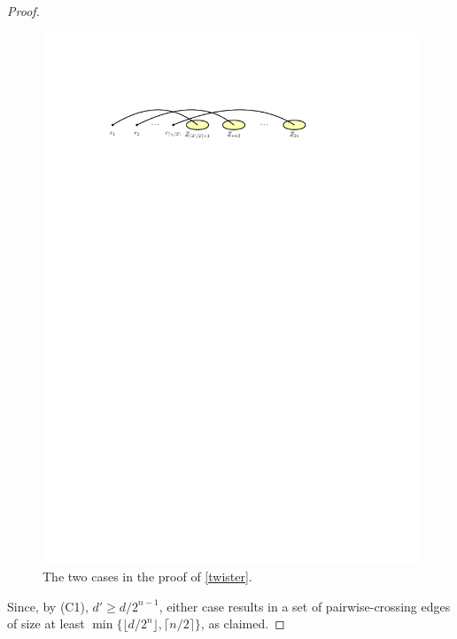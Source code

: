 \documentclass[kpfonts]{patmorin}
\renewcommand{\ge}{\geqslant}
\begin{document}
\begin{proof}
\begin{figure}[!h]
			\includegraphics{figs/median-2}
		\caption{The two cases in the proof of \cref{twister}.}
	\end{figure}
	Since, by (C1), $d'\ge d/2^{n-1}$, either case results in a set of pairwise-crossing edges of size at least $\min\{\lfloor d/2^n\rfloor,\lceil n/2\rceil\}$, as claimed.


\end{proof}
\end{document}
